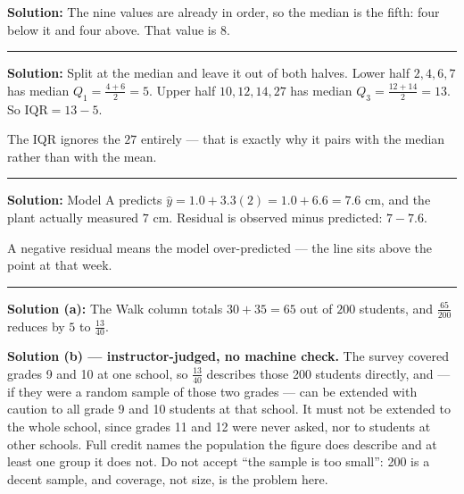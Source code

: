 \documentclass[12pt]{article}
\begin{document}



\textbf{Solution:} The nine values are already in order, so the median is the
fifth: four below it and four above. That value is $8$. 

\vspace{0.15cm}\noindent\rule{\linewidth}{0.2pt}\vspace{0.15cm}


\textbf{Solution:} Split at the median and leave it out of both halves.
Lower half $2, 4, 6, 7$ has median $Q_1 = \frac{4+6}{2} = 5$. Upper half
$10, 12, 14, 27$ has median $Q_3 = \frac{12+14}{2} = 13$. So
$\text{IQR} = 13 - 5$. 

The IQR ignores the $27$ entirely --- that is exactly why it pairs with the
median rather than with the mean.

\vspace{0.15cm}\noindent\rule{\linewidth}{0.2pt}\vspace{0.15cm}


\textbf{Solution:} Model A predicts
$\hat{y} = 1.0 + 3.3(2) = 1.0 + 6.6 = 7.6$ cm, and the plant actually measured
$7$ cm. Residual is observed minus predicted:
$7 - 7.6$. 

A negative residual means the model over-predicted --- the line sits above the
point at that week.

\vspace{0.15cm}\noindent\rule{\linewidth}{0.2pt}\vspace{0.15cm}


\textbf{Solution (a):} The Walk column totals $30 + 35 = 65$ out of $200$
students, and $\frac{65}{200}$ reduces by $5$ to $\frac{13}{40}$.

\textbf{Solution (b) --- instructor-judged, no machine check.} The survey
covered grades 9 and 10 at one school, so $\frac{13}{40}$ describes those 200
students directly, and --- if they were a random sample of those two grades ---
can be extended with caution to all grade 9 and 10 students at that school. It
must not be extended to the whole school, since grades 11 and 12 were never
asked, nor to students at other schools. Full credit names the population the
figure does describe and at least one group it does not. Do not accept ``the
sample is too small'': 200 is a decent sample, and coverage, not size, is the
problem here.
\end{document}
